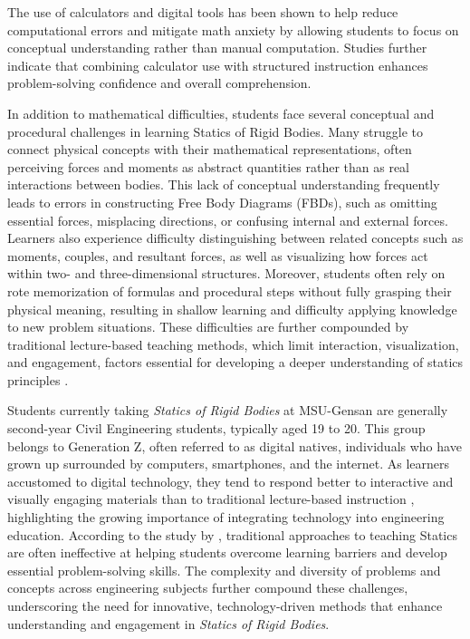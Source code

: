 The use of calculators and digital tools has been shown to help reduce computational errors and mitigate math anxiety by allowing students to focus on conceptual understanding rather than manual computation. \autocite{segarra_does_2024} Studies further indicate that combining calculator use with structured instruction enhances problem-solving confidence and overall comprehension.

In addition to mathematical difficulties, students face several conceptual and procedural challenges in learning Statics of Rigid Bodies. Many struggle to connect physical concepts with their mathematical representations, often perceiving forces and moments as abstract quantities rather than as real interactions between bodies. This lack of conceptual understanding frequently leads to errors in constructing Free Body Diagrams (FBDs), such as omitting essential forces, misplacing directions, or confusing internal and external forces. Learners also experience difficulty distinguishing between related concepts such as moments, couples, and resultant forces, as well as visualizing how forces act within two- and three-dimensional structures. Moreover, students often rely on rote memorization of formulas and procedural steps without fully grasping their physical meaning, resulting in shallow learning and difficulty applying knowledge to new problem situations. These difficulties are further compounded by traditional lecture-based teaching methods, which limit interaction, visualization, and engagement, factors essential for developing a deeper understanding of statics principles \autocite{salami_challenges_2025}. 

Students currently taking \textit{Statics of Rigid Bodies} at MSU-Gensan are generally second-year Civil Engineering students, typically aged 19 to 20. This group belongs to Generation Z, often referred to as digital natives, individuals who have grown up surrounded by computers, smartphones, and the internet. As learners accustomed to digital technology, they tend to respond better to interactive and visually engaging materials than to traditional lecture-based instruction \autocite{rutz_student_2003}, highlighting the growing importance of integrating technology into engineering education. According to the study by \cite{de_la_hoz_self-explanation_2023} , traditional approaches to teaching Statics are often ineffective at helping students overcome learning barriers and develop essential problem-solving skills. The complexity and diversity of problems and concepts across engineering subjects further compound these challenges, underscoring the need for innovative, technology-driven methods that enhance understanding and engagement in \textit{Statics of Rigid Bodies}.

